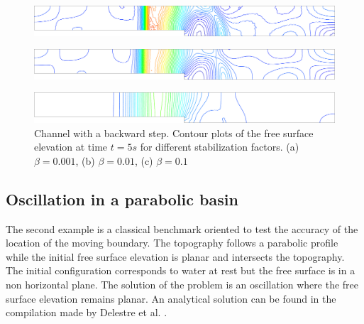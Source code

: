 \documentclass[a4paper,12pt]{article}
\begin{document}
\begin{figure}[H]
    \begin{subfigure}{.05\textwidth}
        \caption{}
    \end{subfigure}
    \begin{minipage}[c]{.94\textwidth}
        \includegraphics[width=\textwidth]{img/step/stab_0.001_time_5.pdf}
    \end{minipage}
    \par\medskip
    \begin{subfigure}{.05\textwidth}
        \caption{}
    \end{subfigure}
    \begin{minipage}[c]{.94\textwidth}
        \includegraphics[width=\textwidth]{img/step/stab_0.01_time_5.pdf}
    \end{minipage}
    \par\medskip
    \begin{subfigure}{.05\textwidth}
        \caption{}
    \end{subfigure}
    \begin{minipage}[c]{.94\textwidth}
        \includegraphics[width=\textwidth]{img/step/stab_0.1_time_5.pdf}
    \end{minipage}
\caption{Channel with a backward step. Contour plots of the free surface elevation at time $t=5s$ for different stabilization factors. (a) $\beta=0.001$, (b) $\beta=0.01$, (c) $\beta=0.1$}
\label{stab_parameters_time2}
\end{figure}



\subsection{Oscillation in a parabolic basin}

The second example is a classical benchmark oriented to test the accuracy of the location of the moving boundary. The topography follows a parabolic profile while the initial free surface elevation is planar and intersects the topography. The initial configuration corresponds to water at rest but the free surface is in a non horizontal plane. The solution of the problem is an oscillation where the free surface elevation remains planar. An analytical solution can be found in the compilation made by Delestre et al. \cite{delestre2013}.
\end{document}

